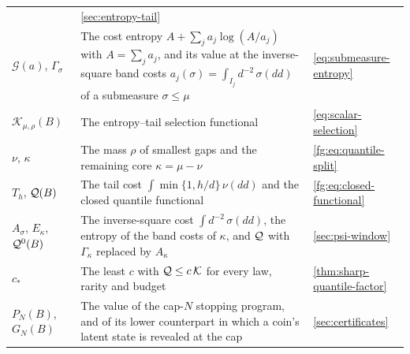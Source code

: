 {\begin{longtable}{@{}>{\raggedright\arraybackslash}p{}
                     >{\raggedright\arraybackslash}p{}
                     >{\raggedright\arraybackslash}p{}@{}}
 & \cref{sec:entropy-tail}\\
$\mathcal G(a)$, $\Gamma_\sigma$ & The cost entropy $A+\sum_ja_j\log(A/a_j)$ with
 $A=\sum_ja_j$, and its value at the inverse-square band costs
 $a_j(\sigma)=\int_{I_j}d^{-2}\,\sigma(dd)$ of a submeasure
 $\sigma\le\mu$ & \eqref{eq:submeasure-entropy}\\
$\mathcal K_{\mu,\rho}(B)$ & The entropy--tail selection functional
 & \eqref{eq:scalar-selection}\\
$\nu$, $\kappa$ & The mass $\rho$ of smallest gaps and the remaining core
 $\kappa=\mu-\nu$ & \eqref{fg:eq:quantile-split}\\
$T_h$, $\mathcal Q(B)$ & The tail cost $\int\min\{1,h/d\}\,\nu(dd)$ and the closed
 quantile functional & \eqref{fg:eq:closed-functional}\\
$A_\sigma$, $E_\kappa$, $\mathcal Q^0(B)$ & The inverse-square cost
 $\int d^{-2}\,\sigma(dd)$, the entropy of the band costs of $\kappa$, and
 $\mathcal Q$ with $\Gamma_\kappa$ replaced by $A_\kappa$ & \cref{sec:psi-window}\\
$c_*$ & The least $c$ with $\mathcal Q\le c\,\mathcal K$ for every law, rarity and
 budget & \cref{thm:sharp-quantile-factor}\\
$P_N(B)$, $G_N(B)$ & The value of the cap-$N$ stopping program, and of
 its lower counterpart in which a coin's latent state is revealed at the
 cap & \cref{sec:certificates}\\
\bottomrule
\end{longtable}}
